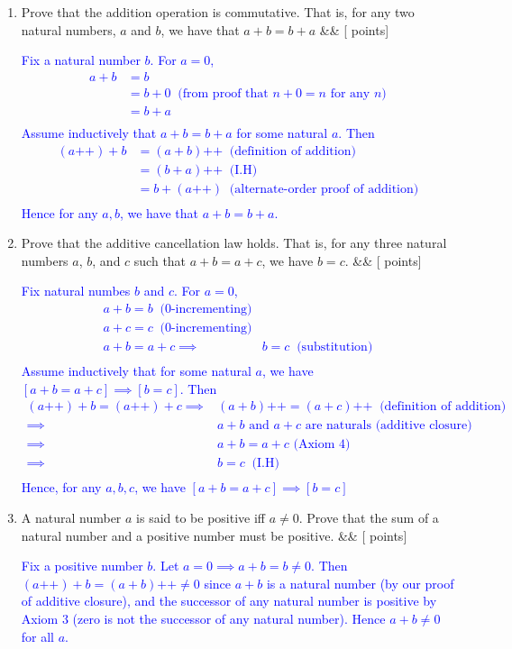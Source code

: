 \documentclass[12pt]{article}
\newcommand{\points}[1]{\hfill {[#1 points]}}
\newcommand{\problem}[2][]{%
  \item {#2}%
  \ifx&#1&%
  \else%
    \points{#1}%
  \fi
  \par\vspace{0.5em}
}
\begin{document}
\begin{enumerate}[leftmargin=*, label=\textbf{\arabic*.}]
	 \problem{Prove that the addition operation is commutative. That is, for any two natural numbers, $a$ and $b$, we have that $a+b = b+a$}
    	\textcolor{blue}{Fix a natural number $b$. For $a=0$, 
	\begin{align*}
	a + b &= b \\
	&= b + 0 \;\; \text{(from proof that $n+0=n$ for any $n$)} \\
	&= b + a \\
	\end{align*}
	Assume inductively that $a + b = b + a$ for some natural $a$. Then
	\begin{align*}
	(a\text{++}) + b &= (a + b)\text{++} \;\; \text{(definition of addition)} \\
	&= (b + a)\text{++} \;\; \text{(I.H)} \\
	&= b+(a\text{++}) \;\; \text{(alternate-order proof of addition)} \\
	\end{align*}
	Hence for any $a,b$, we have that $a + b = b + a$.}
	
	
	\problem{Prove that the additive cancellation law holds. That is, for any three natural numbers $a$, $b$, and $c$ such that $a + b = a + c$, we have $b = c$.}
    	\textcolor{blue}{Fix natural numbes $b$ and $c$. For $a=0$, 
	\begin{align*}
	a+b = b \;\; \text{($0$-incrementing)} \\
	a+c = c \;\; \text{($0$-incrementing)} \\
	a+b=a+c \implies& b = c \;\; \text{(substitution)}\\
	\end{align*}
	Assume inductively that for some natural $a$, we have $[a+b=a+c] \implies [b=c]$. Then
	\begin{align*}
	(a\text{++})+b=(a\text{++})+c \implies& (a+b)\text{++} = (a+c)\text{++} \;\; \text{(definition of addition)} \\
	\implies& \text{$a + b$ and $a + c$ are naturals (additive closure)} \\
	\implies& \text{$a + b = a + c$ (Axiom $4$)} \\
	\implies& b = c \;\; \text{(I.H)} \\
	\end{align*}
	Hence, for any $a,b,c$, we have $[a + b = a + c] \implies [b = c]$}
	
	\problem{A natural number $a$ is said to be positive iff $a \neq 0$. Prove that the sum of a natural number and a positive number must be positive.}
	\textcolor{blue}{Fix a positive number $b$. Let $a = 0 \implies a + b = b \neq 0$. Then $(a\text{++}) + b = (a+b)\text{++} \neq 0$ since $a + b$ is a natural number (by our proof of additive closure), and the successor of any natural number is positive by Axiom $3$ (zero is not the successor of any natural number). Hence $a + b \neq 0$ for all $a$.}
	

\end{enumerate}
\end{document}
